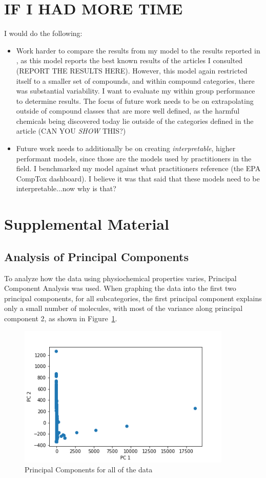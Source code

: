 \documentclass[12pt, oneside]{article}   	%
\begin{document}
\section{IF I HAD MORE TIME}
I would do the following:
\begin{itemize}
	\item Work harder to compare the results from my model to the results reported in \cite{English2021}, as this model reports the best known results of the articles I consulted (REPORT THE RESULTS HERE). However, this model again restricted itself to a smaller set of compounds, and within compound categories, there was substantial variability. I want to evaluate my within group performance to determine results. The focus of future work needs to be on extrapolating outside of compound classes that are more well defined, as the harmful chemicals being discovered today lie outside of the categories defined in the article (CAN YOU \emph{SHOW} THIS?)
	\item Future work needs to additionally be on creating \emph{interpretable}, higher performant models, since those are the models used by practitioners in the field. I benchmarked my model against what practitioners reference (the EPA CompTox dashboard). I believe it was \cite{Mansouri2018} that said that these models need to be interpretable...now why is that?
\end{itemize}

\newpage
\section{Supplemental Material}

\subsection{Analysis of Principal Components}
To analyze how the data using physiochemical properties varies, Principal Component Analysis was used. When graphing the data into the first two principal components, for all subcategories, the first principal component explains only a small number of molecules, with most of the variance along principal component 2, as shown in Figure~\ref{fig:pc1}.

\begin{figure}[!h] %
   \centering
   \includegraphics[width=4in]{PCA_all.png} 
   \caption{Principal Components for all of the data}
   \label{fig:pc1}
\end{figure}
\end{document}
